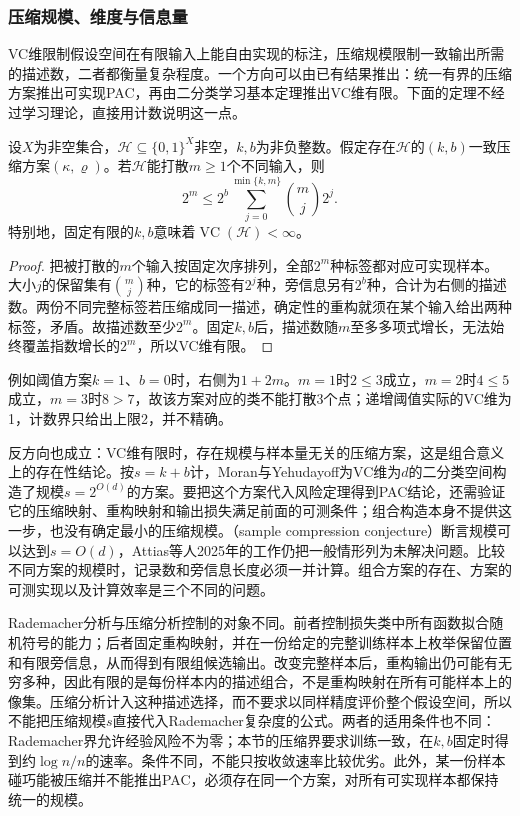 \subsubsection{压缩规模、维度与信息量}

VC维限制假设空间在有限输入上能自由实现的标注，压缩规模限制一致输出所需的描述数，二者都衡量复杂程度。一个方向可以由已有结果推出：统一有界的压缩方案推出可实现PAC，再由二分类学习基本定理推出VC维有限。下面的定理不经过学习理论，直接用计数说明这一点。

\begin{theorem}[压缩参数对打散的限制]
\label{thm:compression-shattering-count}
设$X$为非空集合，$\mathcal H\subseteq\{0,1\}^X$非空，$k,b$为非负整数。假定存在$\mathcal H$的$(k,b)$一致压缩方案$(\kappa,\varrho)$。若$\mathcal H$能打散$m\geq1$个不同输入，则
\[
 2^m\leq 2^b\sum_{j=0}^{\min\{k,m\}}\binom mj2^j.
\]
特别地，固定有限的$k,b$意味着$\operatorname{VC}(\mathcal H)<\infty$。
\end{theorem}

\begin{proof}
把被打散的$m$个输入按固定次序排列，全部$2^m$种标签都对应可实现样本。大小$j$的保留集有$\binom mj$种，它的标签有$2^j$种，旁信息另有$2^b$种，合计为右侧的描述数。两份不同完整标签若压缩成同一描述，确定性的重构就须在某个输入给出两种标签，矛盾。故描述数至少$2^m$。固定$k,b$后，描述数随$m$至多多项式增长，无法始终覆盖指数增长的$2^m$，所以VC维有限。
\end{proof}

例如阈值方案$k=1$、$b=0$时，右侧为$1+2m$。$m=1$时$2\leq3$成立，$m=2$时$4\leq5$成立，$m=3$时$8>7$，故该方案对应的类不能打散3个点；递增阈值实际的VC维为1，计数界只给出上限2，并不精确。

反方向也成立：VC维有限时，存在规模与样本量无关的压缩方案，这是组合意义上的存在性结论。按$s=k+b$计，Moran与Yehudayoff为VC维为$d$的二分类空间构造了规模$s=2^{O(d)}$的方案。要把这个方案代入风险定理得到PAC结论，还需验证它的压缩映射、重构映射和输出损失满足前面的可测条件；组合构造本身不提供这一步，也没有确定最小的压缩规模。（sample compression conjecture）断言规模可以达到$s=O(d)$，Attias等人2025年的工作仍把一般情形列为未解决问题。比较不同方案的规模时，记录数和旁信息长度必须一并计算。组合方案的存在、方案的可测实现以及计算效率是三个不同的问题。

Rademacher分析与压缩分析控制的对象不同。前者控制损失类中所有函数拟合随机符号的能力；后者固定重构映射，并在一份给定的完整训练样本上枚举保留位置和有限旁信息，从而得到有限组候选输出。改变完整样本后，重构输出仍可能有无穷多种，因此有限的是每份样本内的描述组合，不是重构映射在所有可能样本上的像集。压缩分析计入这种描述选择，而不要求以同样精度评价整个假设空间，所以不能把压缩规模$s$直接代入Rademacher复杂度的公式。两者的适用条件也不同：Rademacher界允许经验风险不为零；本节的压缩界要求训练一致，在$k,b$固定时得到约$\log n/n$的速率。条件不同，不能只按收敛速率比较优劣。此外，某一份样本碰巧能被压缩并不能推出PAC，必须存在同一个方案，对所有可实现样本都保持统一的规模。

